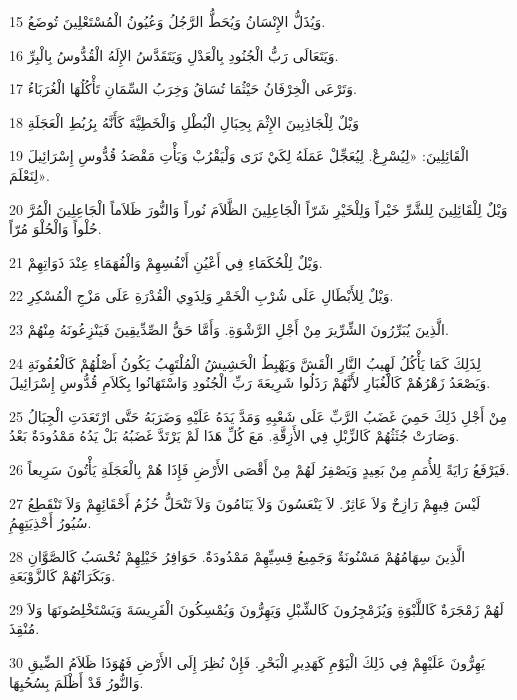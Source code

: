 \par 15 وَيُذَلُّ الإِنْسَانُ وَيُحَطُّ الرَّجُلُ وَعُيُونُ الْمُسْتَعْلِينَ تُوضَعُ.
\par 16 وَيَتَعَالَى رَبُّ الْجُنُودِ بِالْعَدْلِ وَيَتَقَدَّسُ الإِلَهُ الْقُدُّوسُ بِالْبِرِّ.
\par 17 وَتَرْعَى الْخِرْفَانُ حَيْثُمَا تُسَاقُ وَخِرَبُ السِّمَانِ تَأْكُلُهَا الْغُرَبَاءُ.
\par 18 وَيْلٌ لِلْجَاذِبِينَ الإِثْمَ بِحِبَالِ الْبُطْلِ وَالْخَطِيَّةَ كَأَنَّهُ بِرُبُطِ الْعَجَلَةِ
\par 19 الْقَائِلِينَ: «لِيُسْرِعْ. لِيُعَجِّلْ عَمَلَهُ لِكَيْ نَرَى وَلْيَقْرُبْ وَيَأْتِ مَقْصَدُ قُدُّوسِ إِسْرَائِيلَ لِنَعْلَمَ».
\par 20 وَيْلٌ لِلْقَائِلِينَ لِلشَّرِّ خَيْراً وَلِلْخَيْرِ شَرّاً الْجَاعِلِينَ الظَّلاَمَ نُوراً وَالنُّورَ ظَلاَماً الْجَاعِلِينَ الْمُرَّ حُلْواً وَالْحُلْوَ مُرّاً.
\par 21 وَيْلٌ لِلْحُكَمَاءِ فِي أَعْيُنِ أَنْفُسِهِمْ وَالْفُهَمَاءِ عِنْدَ ذَوَاتِهِمْ.
\par 22 وَيْلٌ لِلأَبْطَالِ عَلَى شُرْبِ الْخَمْرِ وَلِذَوِي الْقُدْرَةِ عَلَى مَزْجِ الْمُسْكِرِ.
\par 23 الَّذِينَ يُبَرِّرُونَ الشِّرِّيرَ مِنْ أَجْلِ الرَّشْوَةِ. وَأَمَّا حَقُّ الصِّدِّيقِينَ فَيَنْزِعُونَهُ مِنْهُمْ.
\par 24 لِذَلِكَ كَمَا يَأْكُلُ لَهِيبُ النَّارِ الْقَشَّ وَيَهْبِطُ الْحَشِيشُ الْمُلْتَهِبُ يَكُونُ أَصْلُهُمْ كَالْعُفُونَةِ وَيَصْعَدُ زَهْرُهُمْ كَالْغُبَارِ لأَنَّهُمْ رَذَلُوا شَرِيعَةَ رَبِّ الْجُنُودِ وَاسْتَهَانُوا بِكَلاَمِ قُدُّوسِ إِسْرَائِيلَ.
\par 25 مِنْ أَجْلِ ذَلِكَ حَمِيَ غَضَبُ الرَّبِّ عَلَى شَعْبِهِ وَمَدَّ يَدَهُ عَلَيْهِ وَضَرَبَهُ حَتَّى ارْتَعَدَتِ الْجِبَالُ وَصَارَتْ جُثَثُهُمْ كَالزِّبْلِ فِي الأَزِقَّةِ. مَعَ كُلِّ هَذَا لَمْ يَرْتَدَّ غَضَبُهُ بَلْ يَدُهُ مَمْدُودَةٌ بَعْدُ.
\par 26 فَيَرْفَعُ رَايَةً لِلأُمَمِ مِنْ بَعِيدٍ وَيَصْفِرُ لَهُمْ مِنْ أَقْصَى الأَرْضِ فَإِذَا هُمْ بِالْعَجَلَةِ يَأْتُونَ سَرِيعاً.
\par 27 لَيْسَ فِيهِمْ رَازِحٌ وَلاَ عَاثِرٌ. لاَ يَنْعَسُونَ وَلاَ يَنَامُونَ وَلاَ تَنْحَلُّ حُزُمُ أَحْقَائِهِمْ وَلاَ تَنْقَطِعُ سُيُورُ أَحْذِيَتِهِمُِ.
\par 28 الَّذِينَ سِهَامُهُمْ مَسْنُونَةٌ وَجَمِيعُ قِسِيِّهِمْ مَمْدُودَةٌ. حَوَافِرُ خَيْلِهِمْ تُحْسَبُ كَالصَّوَّانِ وَبَكَرَاتُهُمْ كَالزَّوْبَعَةِ.
\par 29 لَهُمْ زَمْجَرَةٌ كَاللَّبْوَةِ وَيُزَمْجِرُونَ كَالشِّبْلِ وَيَهِرُّونَ وَيُمْسِكُونَ الْفَرِيسَةَ وَيَسْتَخْلِصُونَهَا وَلاَ مُنْقِذَ.
\par 30 يَهِرُّونَ عَلَيْهِمْ فِي ذَلِكَ الْيَوْمِ كَهَدِيرِ الْبَحْرِ. فَإِنْ نُظِرَ إِلَى الأَرْضِ فَهُوَذَا ظَلاَمُ الضِّيقِ وَالنُّورُ قَدْ أَظْلَمَ بِسُحُبِهَا.

